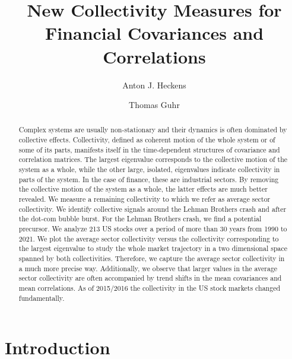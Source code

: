 \documentclass[aps, pra, groupedaddress, showkeys, twocolumn, floatfix, 10pt]{revtex4-2}
\begin{document}
\title{New Collectivity Measures for Financial Covariances and Correlations}

\author{Anton J. Heckens}
\author{Thomas Guhr}




\begin{abstract}
 Complex systems are usually non-stationary and their dynamics
  is often dominated by collective effects.  Collectivity, defined as
  coherent motion of the whole system or of some of its parts,
  manifests itself in the time-dependent structures of covariance and
  correlation matrices. The largest eigenvalue corresponds to the
  collective motion of the system as a whole, while the other large, isolated, eigenvalues indicate collectivity in parts of the system. In the case
  of finance, these are industrial sectors. By removing the collective
  motion of the system as a whole, the latter effects are much better revealed. 
  We measure a remaining collectivity to which we refer as average sector collectivity. 
  We identify
  collective signals around the Lehman Brothers crash and after the
  dot-com bubble burst.  For the Lehman Brothers crash, we find a
  potential precursor. We analyze 213 US stocks over a period
  of more than 30 years from 1990 to 2021.
  We plot the average sector collectivity versus the collectivity
  corresponding to the largest eigenvalue to study the whole market
  trajectory in a two dimensional space spanned by both collectivities. Therefore, we capture the average sector collectivity in a much more precise way. Additionally, we
  observe that larger values in the average sector collectivity are often
  accompanied by trend shifts in the mean covariances and mean
  correlations.  As of 2015/2016 the collectivity in the US stock
  markets changed fundamentally.
\end{abstract}



\maketitle



\section{\label{sec:Introduction}Introduction}
\end{document}
